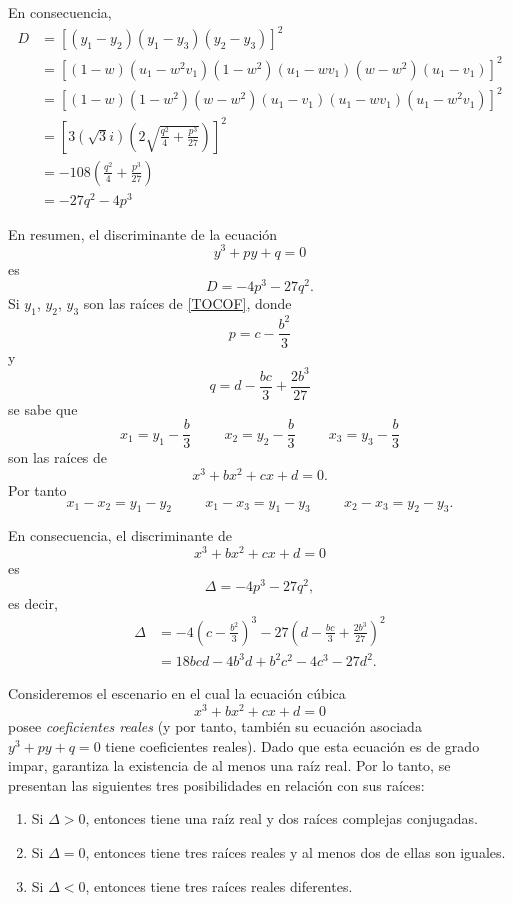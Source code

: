 \newpage\noindent
En consecuencia,
\begin{align*}
    D &=\left[ (y_1-y_2)(y_1-y_3)(y_2-y_3) \right]^2 \\
    &=\left[ (1-w)\left( u_1-w^2v_1 \right) \left( 1-w^2 \right) (u_1-wv_1) \left( w-w^2 \right) (u_1-v_1) \right]^2 \\
    &=\left[ (1-w) \left( 1-w^2 \right) \left( w-w^2 \right) (u_1-v_1) (u_1-wv_1) \left( u_1-w^2v_1 \right) \right]^2 \\
    &=\left[ 3 \left( \sqrt{3}i \right) \left( 2 \sqrt{\frac{q^2}{4}+\frac{p^3}{27}} \right) \right]^2 \\
    &= -108 \left( \frac{q^2}{4} + \frac{p^3}{27} \right) \\
    &=-27q^2-4p^3
\end{align*}

En resumen, el discriminante de la ecuación
\begin{equation}
    y^3+py+q=0 \label{TOCOF}
\end{equation}
es
$$D=-4p^3-27q^2.$$
Si $y_1$, $y_2$, $y_3$ son las raíces de \eqref{TOCOF}, donde
$$p=c-\frac{b^2}{3}$$
y
$$q=d-\frac{bc}{3}+\frac{2b^3}{27}$$
se sabe que
$$x_1 = y_1-\frac{b}{3} \hspace{1cm} x_2 = y_2-\frac{b}{3} \hspace{1cm} x_3 = y_3-\frac{b}{3}$$
son las raíces de
$$x^3+bx^2+cx+d=0.$$
Por tanto
$$x_1-x_2=y_1-y_2 \hspace{1cm} x_1-x_3=y_1-y_3 \hspace{1cm} x_2-x_3=y_2-y_3.$$

En consecuencia, el discriminante de
$$x^3+bx^2+cx+d=0$$
es
$$\Delta =-4p^3-27q^2,$$
es decir,
\begin{align*}
    \Delta & = -4 \left( c - \frac{b^2}{3} \right)^3 - 27 \left( d - \frac{bc}{3} + \frac{2b^3}{27} \right)^2 \\
    & =18bcd-4b^3d+b^2c^2-4c^3-27d^2.
\end{align*}

Consideremos el escenario en el cual la ecuación cúbica
$$x^3+bx^2+cx+d=0$$
posee \emph{coeficientes reales} (y por tanto, también su ecuación asociada $y^3 + py + q=0$ tiene coeficientes reales). Dado que esta ecuación es de grado impar, garantiza la existencia de al menos una raíz real. Por lo tanto, se presentan las siguientes tres posibilidades en relación con sus raíces:\newpage
\begin{enumerate}[label=\roman*.]
    \item Si $\Delta >0$, entonces tiene una raíz real y dos raíces complejas conjugadas.
    \item Si $\Delta =0$, entonces tiene tres raíces reales y al menos dos de ellas son iguales.
    \item Si $\Delta <0$, entonces tiene tres raíces reales diferentes.
\end{enumerate}

